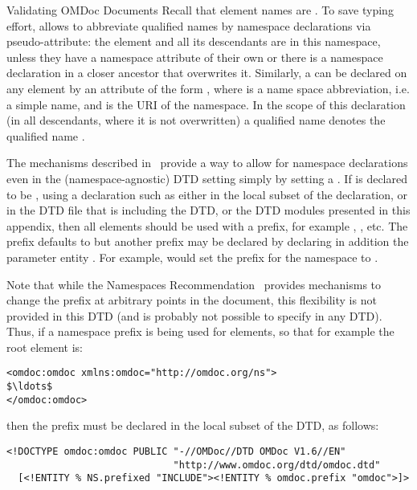 \begin{module}[id=validating]
\begin{omgroup}[id=validating]{Validating OMDoc Documents}
Recall that element names are . To save
typing effort, {\xml} allows to abbreviate qualified names by namespace declarations via
{} pseudo-attribute: the element and all its descendants are in this
namespace, unless they have a namespace attribute of their own or there is a namespace
declaration in a closer ancestor that overwrites it.  Similarly, a
{} can be declared on any element by an attribute of the
form {}, where {} is a name space abbreviation,
i.e. a simple name, and {} is the URI of the namespace.  In the scope of
this declaration (in all descendants, where it is not overwritten) a qualified name
{} denotes the qualified name {}.

  The mechanisms described in~\cite{AltBou:mox01} provide a way to allow for namespace
  declarations even in the (namespace-agnostic) DTD setting simply by setting a
  {}. If {} is declared to be
  {}, using a declaration such as {} either in the local subset of the {} declaration, or
  in the DTD file that is including the {\omdoc} DTD, or the DTD modules presented in this
  appendix, then all {\omdoc} elements should be used with a prefix, for example
  {}, {}, etc. The prefix defaults to
  {} but another prefix may be declared by declaring in addition the
  parameter entity {}. For example, {} would set the prefix for the {\omdoc} namespace to
  {}.

Note that while the Namespaces Recommendation~\cite{BraHol:xmlns99} provides
mechanisms to change the prefix at arbitrary points in the document, this
flexibility is not provided in this DTD (and is probably not possible to specify
in any DTD).  Thus, if a namespace prefix is being used for {\omdoc} elements, so
that for example the root element is:
\begin{lstlisting}[index={omdoc:omdoc},mathescape]
<omdoc:omdoc xmlns:omdoc="http://omdoc.org/ns">
$\ldots$
</omdoc:omdoc>
\end{lstlisting}
then the prefix must be declared in the local subset of the DTD, as follows:
\begin{lstlisting}[index={omdoc:omdoc,DOCTYPE,ENTITY,NS.prefixed,INCLUDE}]
<!DOCTYPE omdoc:omdoc PUBLIC "-//OMDoc//DTD OMDoc V1.6//EN"
                             "http://www.omdoc.org/dtd/omdoc.dtd"
  [<!ENTITY % NS.prefixed "INCLUDE"><!ENTITY % omdoc.prefix "omdoc">]>
\end{lstlisting}


\end{omgroup}
\end{module}
